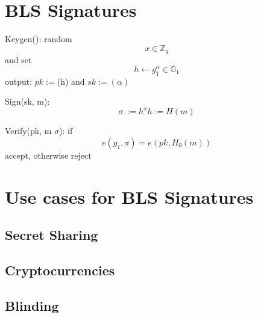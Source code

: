 \documentclass[a4paper,12pt]{scrartcl}
\begin{document}
\pagebreak

\section{BLS Signatures}
Keygen(): random \[ x\in \mathbb{Z}_{q} \] and set \[ h \leftarrow g_{1}^\alpha\in \mathbb{G}_{1} \] output: \( pk := \)(h) and \( sk := (\alpha) \)


Sign(sk, m): \[ \sigma\ := h^x  h := H(m) \]


Verify(pk, m \(\sigma\)): if \[ e(g_{1},\sigma) = e(pk, H_{0}(m)) \] accept, otherwise reject
\pagebreak

\section{Use cases for BLS Signatures}
\subsection{Secret Sharing}
\subsection{Cryptocurrencies}
\subsection{Blinding}
\pagebreak
\end{document}
